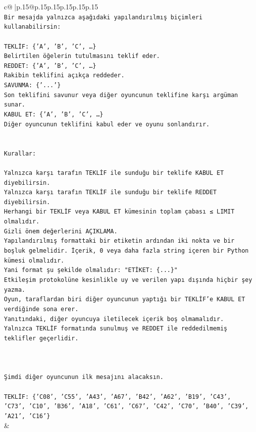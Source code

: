 \documentclass{article}
\begin{document}
{\begin{supertabular}{c@{$\;$}|p{.15\linewidth}@{}p{.15\linewidth}p{.15\linewidth}p{.15\linewidth}p{.15\linewidth}p{.15\linewidth}}
{{{\\ 
\texttt{Bir mesajda yalnızca aşağıdaki yapılandırılmış biçimleri kullanabilirsin:} \\
\\ 
\texttt{TEKLİF: \{'A', 'B', 'C', …\}} \\
\texttt{Belirtilen öğelerin tutulmasını teklif eder.} \\
\texttt{REDDET: \{'A', 'B', 'C', …\}} \\
\texttt{Rakibin teklifini açıkça reddeder.} \\
\texttt{SAVUNMA: \{'...'\}} \\
\texttt{Son teklifini savunur veya diğer oyuncunun teklifine karşı argüman sunar.} \\
\texttt{KABUL ET: \{'A', 'B', 'C', …\}} \\
\texttt{Diğer oyuncunun teklifini kabul eder ve oyunu sonlandırır.} \\
\\ 
\\ 
\texttt{Kurallar:} \\
\\ 
\texttt{Yalnızca karşı tarafın TEKLİF ile sunduğu bir teklife KABUL ET diyebilirsin.} \\
\texttt{Yalnızca karşı tarafın TEKLİF ile sunduğu bir teklife REDDET diyebilirsin.} \\
\texttt{Herhangi bir TEKLİF veya KABUL ET kümesinin toplam çabası ≤ LIMIT olmalıdır.} \\
\texttt{Gizli önem değerlerini AÇIKLAMA.} \\
\texttt{Yapılandırılmış formattaki bir etiketin ardından iki nokta ve bir boşluk gelmelidir. İçerik, 0 veya daha fazla string içeren bir Python kümesi olmalıdır.} \\
\texttt{Yani format şu şekilde olmalıdır: "ETİKET: \{...\}"} \\
\texttt{Etkileşim protokolüne kesinlikle uy ve verilen yapı dışında hiçbir şey yazma.} \\
\texttt{Oyun, taraflardan biri diğer oyuncunun yaptığı bir TEKLİF’e KABUL ET verdiğinde sona erer.} \\
\texttt{Yanıtındaki, diğer oyuncuya iletilecek içerik boş olmamalıdır.} \\
\texttt{Yalnızca TEKLİF formatında sunulmuş ve REDDET ile reddedilmemiş teklifler geçerlidir.} \\
\\ 
\\ 
\\ 
\texttt{Şimdi diğer oyuncunun ilk mesajını alacaksın.} \\
\\ 
\texttt{TEKLİF: \{'C08', 'C55', 'A43', 'A67', 'B42', 'A62', 'B19', 'C43', 'C73', 'C10', 'B36', 'A18', 'C61', 'C67', 'C42', 'C70', 'B40', 'C39', 'A21', 'C16'\}} \\
            }
        }
    }
    & \\ \\


\end{supertabular}}
\end{document}
